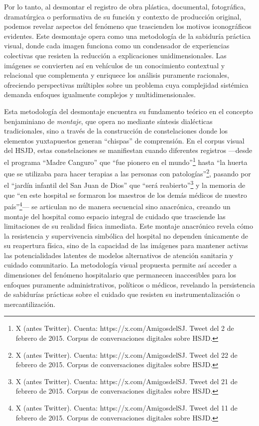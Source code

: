 Por lo tanto, al desmontar el registro de obra plástica, documental, fotográfica, dramatúrgica o performativa de su función y contexto de producción original, podemos revelar aspectos del fenómeno que trascienden los motivos iconográficos evidentes. Este desmontaje opera como una metodología de la sabiduría práctica visual, donde cada imagen funciona como un condensador de experiencias colectivas que resisten la reducción a explicaciones unidimensionales. Las imágenes se convierten así en vehículos de un conocimiento contextual y relacional que complementa y enriquece los análisis puramente racionales, ofreciendo perspectivas múltiples sobre un problema cuya complejidad sistémica demanda enfoques igualmente complejos y multidimensionales.

Esta metodología del desmontaje encuentra su fundamento teórico en el concepto benjaminiano de \textit{montaje}, que opera no mediante síntesis dialécticas tradicionales, sino a través de la construcción de constelaciones donde los elementos yuxtapuestos generan ``chispas'' de comprensión. En el corpus visual del HSJD, estas constelaciones se manifiestan cuando diferentes registros —desde el programa ``Madre Canguro'' que ``fue pionero en el mundo''\footnote{X (antes Twitter). Cuenta: https://x.com/AmigosdelSJ. Tweet del 2 de febrero de 2015. Corpus de conversaciones digitales sobre HSJD.} hasta ``la huerta que se utilizaba para hacer terapias a las personas con patologías''\footnote{X (antes Twitter). Cuenta: https://x.com/AmigosdelSJ. Tweet del 22 de febrero de 2015. Corpus de conversaciones digitales sobre HSJD.}, pasando por el ``jardín infantil del San Juan de Dios'' que ``será reabierto''\footnote{X (antes Twitter). Cuenta: https://x.com/AmigosdelSJ. Tweet del 21 de febrero de 2015. Corpus de conversaciones digitales sobre HSJD.} y la memoria de que ``en este hospital se formaron los maestros de los demás médicos de nuestro país''\footnote{X (antes Twitter). Cuenta: https://x.com/AmigosdelSJ. Tweet del 11 de febrero de 2015. Corpus de conversaciones digitales sobre HSJD.}— se articulan no de manera secuencial sino anacrónica, creando un montaje del hospital como espacio integral de cuidado que trasciende las limitaciones de su realidad física inmediata. Este montaje anacrónico revela cómo la resistencia y supervivencia simbólica del hospital no dependen únicamente de su reapertura física, sino de la capacidad de las imágenes para mantener activas las potencialidades latentes de modelos alternativos de atención sanitaria y cuidado comunitario. La metodología visual propuesta permite así acceder a dimensiones del fenómeno hospitalario que permanecen inaccesibles para los enfoques puramente administrativos, políticos o médicos, revelando la persistencia de sabidurías prácticas sobre el cuidado que resisten su instrumentalización o mercantilización.

